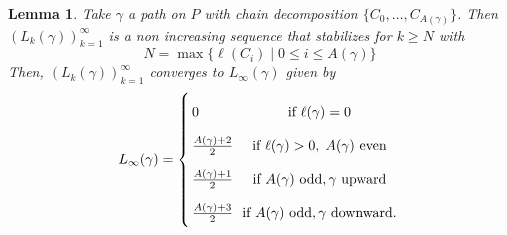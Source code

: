 \documentclass{article}[12pt]
\theoremstyle{exampstyle}
\newtheorem{lemma}[theorem]{Lemma}
\theoremstyle{remark}
\newcommand{\tuple}[3][1]{#2_{#1}, \dots , #2_{#3}}
\begin{document}
\begin{lemma}
    Take $\gamma$ a path on $P$ with chain decomposition $\{ \tuple[0]{C}{A(\gamma)}\}$. Then $\left( L_k(\gamma) \right)_{k=1}^\infty$ is a non increasing sequence that stabilizes for $k \geq N$ with  
    \[
    N = \max \{\ell(C_i) \mid 0 \leq i \leq A(\gamma) \}
    \]
    Then, $\left( L_k(\gamma) \right)_{k=1}^\infty$ converges to $L_{\infty}(\gamma)$ given by 
    \begin{equation*}
        \arraycolsep=1.6pt\def\arraystretch{2}
        L_\infty(\gamma) = \left\{ 
        \begin{array}{lc}
            0 & \text{ if } \ell(\gamma) = 0 \\
           \frac{A(\gamma) + 2}{2} &  \text{ if } \ell(\gamma) > 0, \;A(\gamma) \text{ even}\\
            \frac{A(\gamma)+1}{2} &  \text{ if } A(\gamma) \text{ odd}, \gamma \text{ upward}\\
            \frac{A(\gamma)+3}{2}&  \text{ if } A(\gamma) \text{ odd}, \gamma \text{ downward}.\\
        \end{array}
        \right.
    \end{equation*}
    \label{lemma: L_convergent}
\end{lemma} 
\end{document}
